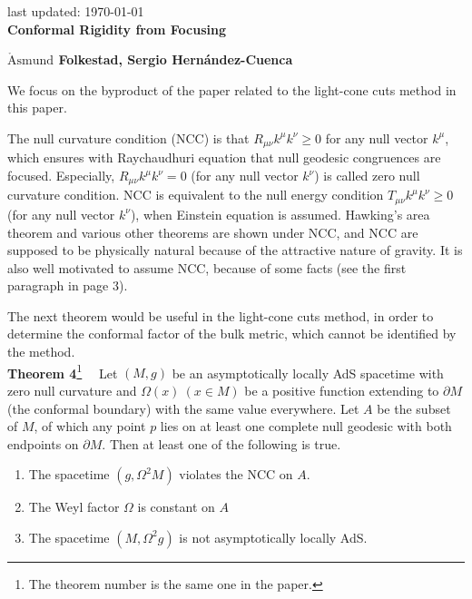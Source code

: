 \documentclass[12pt]{article}
\date{}
\renewcommand{\thefootnote}{\fnsymbol{footnote}}
\begin{document}
{\Large{}
\hfill{\normalsize last updated: \today}
\\[2mm]
\textbf{Conformal Rigidity from Focusing\cite{Folkestad:2021kyz}
}
}

\noindent
\hfill
\textbf{$\mathring{\textrm{A}}\textrm{smund}$ Folkestad, Sergio Hern\' andez-Cuenca}%

\renewcommand{\thefootnote}{\arabic{footnote})}
\setcounter{footnote}{0}
\vspace{12pt}
We focus on the byproduct of the paper related to the light-cone cuts method \cite{Engelhardt:2016wgb,Engelhardt:2016crc,Hernandez-Cuenca:2020ppu} in this paper.

The null curvature condition (NCC) is that $R_{\mu\nu}k^\mu k^\nu \geq 0$ for any null vector $k^\mu$, 
which ensures with Raychaudhuri equation that null geodesic congruences are focused.
Especially, $R_{\mu\nu}k^\mu k^\nu = 0$ (for any null vector $k^\nu$) is called zero null curvature condition.
NCC is equivalent to the null energy condition $T_{\mu\nu}k^\mu k^\nu \geq 0$ (for any null vector $k^\nu$), 
when Einstein equation is assumed.
Hawking's area theorem and various other theorems are shown under NCC, 
and NCC are supposed to be physically natural because of the attractive nature of gravity.
It is also well motivated to assume NCC, because of some facts (see the first paragraph in page 3).

The next theorem would be useful in the light-cone cuts method, 
in order to determine the conformal factor of the bulk metric, which cannot be identified by the method.
\\[12pt]
\textbf{Theorem 4}\footnote{
The theorem number is the same one in the paper.
}~~
Let $(M,g)$ be an asymptotically locally AdS spacetime with zero null curvature and $\Omega(x)~(x\in M)$ be a positive
 function extending to $\partial M$ (the conformal boundary) with the same value everywhere.
Let $A$ be the subset of $M$, of which any point $p$ lies on at least one complete null geodesic with both endpoints on 
$\partial M$.
Then at least one of the following is true.
\begin{enumerate}
	\item The spacetime $(g,\Omega^2M)$ violates the NCC on $A$.
	\item The Weyl factor $\Omega$ is constant on $A$
	\item The spacetime $(M,\Omega^2g)$ is not asymptotically locally AdS.
\end{enumerate}
\end{document}
